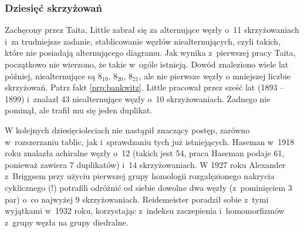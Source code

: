 
\subsubsection{Dziesięć skrzyżowań}
Zachęcony przez Taita, Little zabrał się za alternujące węzły o~11 skrzyżowaniach i~za trudniejsze zadanie, stablicowanie węzłów niealternujących, czyli takich, które nie posiadają alternującego diagramu.
%
%
Jak wynika z~pierwszej pracy Taita, początkowo nie wierzono, że takie w~ogóle istnieją.
Dowód znaleziono wiele lat później, niealternujące są $8_{19}$, $8_{20}$, $8_{21}$, ale nie pierwsze węzły o mniejszej liczbie skrzyżowań.
Patrz fakt \ref{prp:bankwitz}.
Little pracował przez sześć lat (1893 -- 1899) i~znalazł 43 niealternujące węzły o~10 skrzyżowaniach.
Żadnego nie pominął, ale trafił mu się jeden duplikat.
%

W kolejnych dziesięcioleciach nie nastąpił znaczący postęp, zarówno w~rozszerzaniu tablic, jak i~sprawdzaniu tych już istniejących.
Haseman \cite{haseman1918} w~1918 roku znalazła achiralne węzły o~12 (takich jest 54, praca Haseman podaje 61, ponieważ zawiera 7 duplikatów) i~14 skrzyżowaniach.
%
W 1927 roku Alexander z~Briggsem \cite{alexander1927} przy użyciu pierwszej grupy homologii rozgałęzionego nakrycia cyklicznego (!) potrafili odróżnić od siebie dowolne dwa węzły (z~pominięciem 3 par) o~co najwyżej 9 skrzyżowaniach.
%
%
Reidemeister \cite{reidemeister1932} poradził sobie z~tymi wyjątkami w~1932 roku, korzystając z~indeksu zaczepienia i~homomorfizmów z~grupy węzła na grupy diedralne.
%

